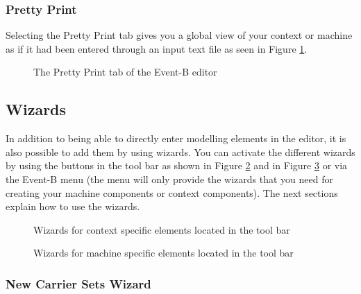 \subsubsection{Pretty Print}

Selecting the \textsf{Pretty Print} tab gives you a global view of your context or machine as if it had been entered through an input text file as seen in Figure \ref{fig_ref_01_eventb_editor10}.

\begin{figure}[!ht]
\begin{center}
	\caption{The Pretty Print tab of the Event-B editor}
	\label{fig_ref_01_eventb_editor10}
\end{center}
\end{figure}


\subsection{Wizards}
\label{eventb_wizards}
In addition to being able to directly enter modelling elements in the editor, it is also possible to add them by using wizards.
You can activate the different wizards by using the buttons in the tool bar as shown in Figure \ref{fig_ref_01_eventb_editor12} and in Figure \ref{fig_ref_01_eventb_editor13} or via the Event-B menu (the menu will only provide the wizards that you need for creating your machine components or context components). The next sections explain how to use the wizards.

\begin{figure}[!ht]
\begin{center}
	\caption{Wizards for context specific elements located in the tool bar}
	\label{fig_ref_01_eventb_editor12}
\end{center}
\end{figure}

\begin{figure}[!ht]
\begin{center}
	\caption{Wizards for machine specific elements located in the tool bar}
	\label{fig_ref_01_eventb_editor13}
\end{center}
\end{figure}


\subsubsection{New Carrier Sets Wizard}

